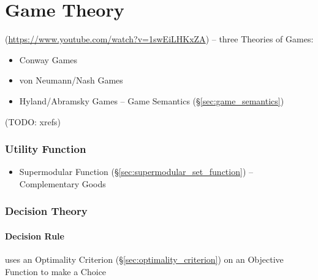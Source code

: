 \part{Game Theory}\label{sec:game_theory}

(\url{https://www.youtube.com/watch?v=1swEiLHKxZA}) -- three Theories of Games:
\begin{itemize}
  \item Conway Games
  \item von Neumann/Nash Games
  \item Hyland/Abramsky Games -- Game Semantics (\S\ref{sec:game_semantics})
\end{itemize}
(TODO: xrefs)



\section{Utility Function}\label{sec:utility_function}

\begin{itemize}
  \item Supermodular Function (\S\ref{sec:supermodular_set_function}) --
    Complementary Goods
\end{itemize}



\section{Decision Theory}\label{sec:decision_theory}

\subsection{Decision Rule}\label{sec:decision_rule}

uses an Optimality Criterion (\S\ref{sec:optimality_criterion}) on an Objective
Function to make a Choice



